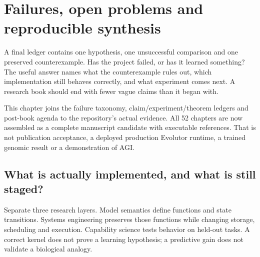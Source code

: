 \chapter{Failures, open problems and reproducible synthesis}
\label{evod52:chapter}
A final ledger contains one hypothesis, one unsuccessful comparison and one
preserved counterexample. Has the project failed, or has it learned something?
The useful answer names what the counterexample rules out, which implementation
still behaves correctly, and what experiment comes next. A research book should
end with fewer vague claims than it began with.

This chapter joins the failure taxonomy, claim/experiment/theorem ledgers and
post-book agenda to the repository's actual evidence. All 52 chapters are now
assembled as a complete manuscript candidate with executable references.
That is not publication acceptance, a deployed production Evolutor runtime,
a trained genomic result or a demonstration of AGI.

\section{What is actually implemented, and what is still staged?}
Separate three research layers. Model semantics define functions and state
transitions. Systems engineering preserves those functions while changing
storage, scheduling and execution. Capability science tests behavior on held-out
tasks. A correct kernel does not prove a learning hypothesis; a predictive gain
does not validate a biological analogy.

